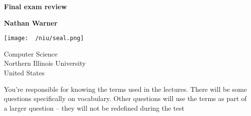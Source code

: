 \documentclass{report}
\title{\Huge{}}
\author{\huge{Nathan Warner}}
\date{\huge{}}
\begin{document}
        \begin{titlepage}
       \begin{center}
           \vspace*{1cm}
    
           \textbf{Final exam review}
    
           \vspace{0.5cm}
            
                
           \vspace{1.5cm}
    
           \textbf{Nathan Warner}
    
           \vfill
                
                
           \vspace{0.8cm}
         
           \texttt{[image: ~/niu/seal.png]}
                
           Computer Science \\
           Northern Illinois University\\
           United States\\
           
                
       \end{center}
    \end{titlepage}
    \tableofcontents
    \pagebreak 
    \bigbreak \noindent 
    You’re responsible for knowing the terms used in the lectures. There will be some questions specifically on vocabulary. Other questions will use the terms as part of a larger question – they will not be redefined during the test
\end{document}
